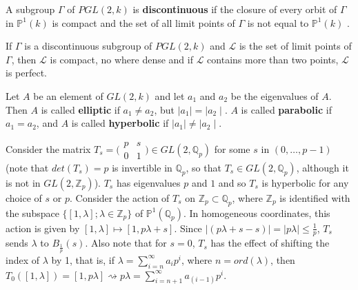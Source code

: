 \begin{definition*} \cite{gvdp} A subgroup $\Gamma$ of $PGL(2,k)$ is \textbf{discontinuous} if the closure of every orbit of $\Gamma$ in $\mathbb{P}^1(k)$ is compact and the set of all limit points of $\Gamma$ is not equal to  $\mathbb{P}^1(k)$ .
\end{definition*}

\begin{proposition*} \cite{gvdp} If $\Gamma$ is a discontinuous subgroup of $PGL(2,k)$  and $\mathcal{L}$ is the set of limit points of $\Gamma$, then $\mathcal{L}$ is compact, no where dense and if $\mathcal{L}$ contains more than two points, $\mathcal{L}$ is perfect.
\end{proposition*}

\begin{definition*} \cite{gvdp}
	Let $A$ be an element of $GL(2,k)$ and let $a_1$ and $a_2$  be the eigenvalues of $A$. Then $A$ is called \textbf{elliptic} if $a_1 \neq a_2$, but $\mid a_1\mid = \mid a_2\mid$. $A$ is called \textbf{parabolic} if $a_1 = a_2$, and $A$ is called \textbf{hyperbolic} if  $\mid a_1\mid \neq \mid a_2\mid$.
\end{definition*}

\begin{example} 
	Consider the matrix $T_s =  \bigl( \begin{smallmatrix}p & s\\ 0 & 1 \end{smallmatrix}\bigr) \in GL(2, \mathbb{Q}_p)$  for some $s$ in $(0,\ldots, p-1)$ (note that $det(T_s) = p$ is invertible in $\mathbb{Q}_p$, so that $T_s \in GL(2,\mathbb{Q}_p)$, although it is not in $GL(2, \mathbb{Z}_p)$). $T_s$ has eigenvalues $p$ and $1$ and so $T_s$ is hyperbolic for any choice of $s$ or $p$. Consider the action of $T_s$ on $\mathbb{Z}_p \subset \mathbb{Q}_p$, where $\mathbb{Z}_p$ is identified with the subspace $\{[1,\lambda];\lambda \in \mathbb{Z}_p \}$ of $\mathbb{P}^1(\mathbb{Q}_p)$. In homogeneous coordinates, this action is given by $[1,\lambda] \mapsto [1, p\lambda +s]$. Since $\mid (p\lambda +s -s)\mid = \mid p\lambda\mid \leq \frac{1}{p}$, $T_s$ sends $\lambda$ to $B_\frac{1}{p}(s)$. Also note that for $s = 0$, $T_s$ has the effect of shifting the index of $\lambda$ by 1, that is, if $\lambda = \sum_{i=n}^\infty a_ip^i$, where $n = ord(\lambda)$, then $T_0([1,\lambda]) = [1, p\lambda] \rightsquigarrow p\lambda = \sum_{i=n+1}^\infty a_{(i-1)}p^i$.	
\end{example}	


